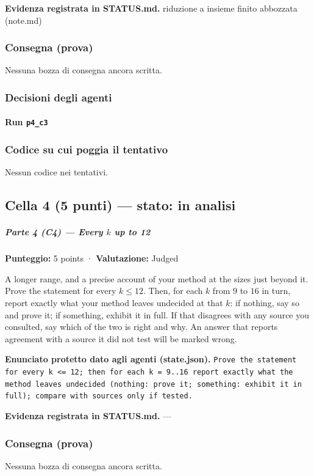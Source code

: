 \documentclass[11pt,a4paper]{article}
\begin{document}
\textbf{Evidenza registrata in STATUS.md.} riduzione a insieme finito abbozzata (note.md)

\subsubsection{Consegna (prova)}
Nessuna bozza di consegna ancora scritta.

\subsubsection{Decisioni degli agenti}
\paragraph{Run \texttt{p4\_c3}}

\subsubsection{Codice su cui poggia il tentativo}
Nessun codice nei tentativi.

\subsection{Cella 4 (5 punti) — stato: in analisi}
\subparagraph{\texorpdfstring{Parte 4 (C4) --- Every \(k\) up to
12}{Parte 4 (C4) --- Every k up to 12}}\label{parte-4-c4-every-k-up-to-12}

\textbf{Punteggio:} 5 points · \textbf{Valutazione:} Judged

A longer range, and a precise account of your method at the sizes just
beyond it. Prove the statement for every \(k \le 12\). Then, for each
\(k\) from \(9\) to \(16\) in turn, report exactly what your method
leaves undecided at that \(k\): if nothing, say so and prove it; if
something, exhibit it in full. If that disagrees with any source you
consulted, say which of the two is right and why. An answer that reports
agreement with a source it did not test will be marked wrong.

\textbf{Enunciato protetto dato agli agenti (state.json).} \texttt{Prove the statement for every k \textless{}= 12; then for each k = 9..16 report exactly what the method leaves undecided (nothing: prove it; something: exhibit it in full); compare with sources only if tested.}

\textbf{Evidenza registrata in STATUS.md.} —

\subsubsection{Consegna (prova)}
Nessuna bozza di consegna ancora scritta.
\end{document}
